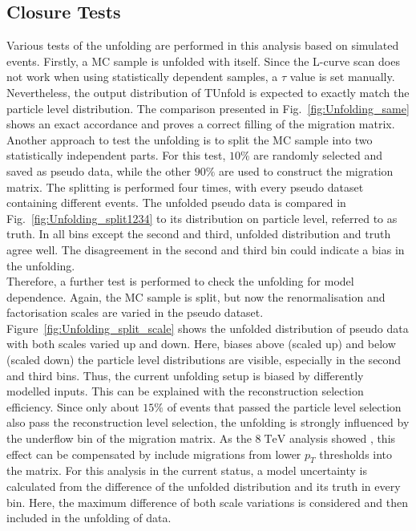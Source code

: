 \subsection{Closure Tests}
	Various tests of the unfolding are performed in this analysis based on simulated events. Firstly, a MC sample is unfolded with itself. Since the L-curve scan does not work when using statistically dependent samples, a $\tau$ value is set manually. Nevertheless, the output distribution of TUnfold is expected to exactly match the particle level distribution. The comparison presented in Fig.~\ref{fig:Unfolding_same} shows an exact accordance and proves a correct filling of the migration matrix. Another approach to test the unfolding is to split the MC sample into two statistically independent parts. For this test, $10\%$ are randomly selected and saved as pseudo data, while the other $90\%$ are used to construct the migration matrix. The splitting is performed four times, with every pseudo dataset containing different events. The unfolded pseudo data is compared in Fig.~\ref{fig:Unfolding_split1234} to its distribution on particle level, referred to as truth. In all bins except the second and third, unfolded distribution and truth agree well. The disagreement in the second and third bin could indicate a bias in the unfolding. \\
	Therefore, a further test is performed to check the unfolding for model dependence. Again, the MC sample is split, but now the renormalisation and factorisation scales are varied in the pseudo dataset. Figure~\ref{fig:Unfolding_split_scale} shows the unfolded distribution of pseudo data with both scales varied up and down. Here, biases above (scaled up) and below (scaled down) the particle level distributions are visible, especially in the second and third bins. Thus, the current unfolding setup is biased by differently modelled inputs. This can be explained with the reconstruction selection efficiency. Since only about $15\%$ of events that passed the particle level selection also pass the reconstruction level selection, the unfolding is strongly influenced by the underflow bin of the migration matrix. As the $8\;\text{TeV}$ analysis showed  \cite{torben_paper}, this effect can be compensated by include migrations from lower $p_T$ thresholds into the matrix. For this analysis in the current status, a model uncertainty is calculated from the difference of the unfolded distribution and its truth in every bin. Here, the maximum difference of both scale variations is considered and then included in the unfolding of data.
	
